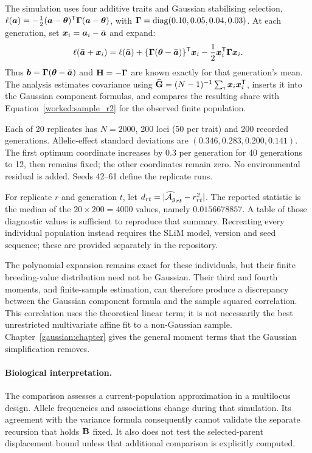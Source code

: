 The simulation uses four additive traits and Gaussian stabilising selection,
$\ell(\boldsymbol{a})=-\tfrac12(\boldsymbol{a}-\boldsymbol{\theta})^{\mathsf T}
\boldsymbol{\Gamma}(\boldsymbol{a}-\boldsymbol{\theta})$, with
$\boldsymbol{\Gamma}=\operatorname{diag}(0.10,0.05,0.04,0.03)$.
At each generation, set $\boldsymbol{x}_i=\boldsymbol{a}_i-\bar{\boldsymbol{a}}$ and expand:
\[
 \ell(\bar{\boldsymbol{a}}+\boldsymbol{x}_i)
 =\ell(\bar{\boldsymbol{a}})
 +\{\boldsymbol{\Gamma}(\boldsymbol{\theta}-\bar{\boldsymbol{a}})\}^{\mathsf T}\boldsymbol{x}_i
 -\frac12\boldsymbol{x}_i^{\mathsf T}\boldsymbol{\Gamma}\boldsymbol{x}_i .
\]
Thus $\boldsymbol{b}=\boldsymbol{\Gamma}(\boldsymbol{\theta}-\bar{\boldsymbol{a}})$ and $\mathbf{H}=-\boldsymbol{\Gamma}$ are known exactly for that generation's mean. The analysis estimates covariance using
$\widehat{\mathbf{G}}=(N-1)^{-1}\sum_i\boldsymbol{x}_i\boldsymbol{x}_i^{\mathsf T}$,
inserts it into the Gaussian component formulas, and compares the resulting share with Equation~\eqref{worked:sample_r2} for the observed finite population.

Each of 20 replicates has $N=2000$, 200 loci (50 per trait) and 200 recorded generations. Allelic-effect standard deviations are
$(0.346,0.283,0.200,0.141)$. The first optimum coordinate increases by 0.3 per generation for 40 generations to 12, then remains fixed; the other coordinates remain zero. No environmental residual is added. Seeds 42--61 define the replicate runs.

For replicate $r$ and generation $t$, let
$d_{rt}=|\widehat{\mathcal A_g}_{rt}-r_{rt}^2|$. The reported statistic is the median of the $20\times200=4000$ values, namely $0.0156678857$. A table of those diagnostic values is sufficient to reproduce that summary. Recreating every individual population instead requires the SLiM model, version and seed sequence; these are provided separately in the repository.

The polynomial expansion remains exact for these individuals, but their finite breeding-value distribution need not be Gaussian. Their third and fourth moments, and finite-sample estimation, can therefore produce a discrepancy between the Gaussian component formula and the sample squared correlation. This correlation uses the theoretical linear term; it is not necessarily the best unrestricted multivariate affine fit to a non-Gaussian sample. Chapter~\ref{gaussian:chapter} gives the general moment terms that the Gaussian simplification removes.

\paragraph{Biological interpretation.}
The comparison assesses a current-population approximation in a multilocus design. Allele frequencies and associations change during that simulation. Its agreement with the variance formula consequently cannot validate the separate recursion that holds $\mathbf{B}$ fixed. It also does not test the selected-parent displacement bound unless that additional comparison is explicitly computed.

